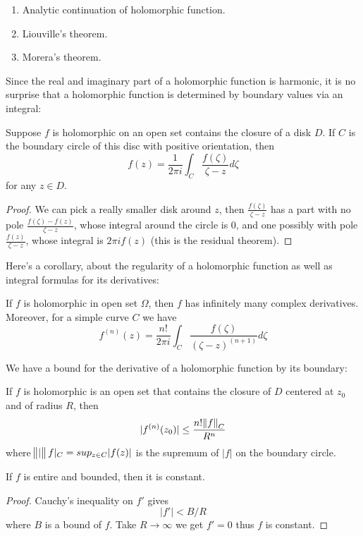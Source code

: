 \documentclass[main.tex]{subfiles}
\begin{document}
\begin{enumerate}
    \item Analytic continuation of holomorphic function. 
    \item Liouville's theorem.
    \item Morera's theorem.
\end{enumerate}

Since the real and imaginary part of a holomorphic function is harmonic, it is no surprise that a holomorphic function is determined by boundary values via an integral:

\begin{theorem}
Suppose $f$ is holomorphic on an open set contains the closure of a disk $D$. If $C$ is the boundary circle of this disc with positive orientation, then
$$
f(z) = \frac{1}{2\pi i} \int_C \frac{f(\zeta)}{\zeta - z} d\zeta
$$
for any $z \in D$.
\end{theorem}

\begin{proof}
We can pick a really smaller disk around $z$, then $\frac{f(\zeta)}{\zeta - z}$ has a part with no pole $\frac{f(\zeta) - f(z)}{\zeta - z}$, whose integral around the circle is $0$, and one possibly with pole $\frac{f(z)}{\zeta - z}$, whose integral is $2\pi i f(z)$ (this is the residual theorem).
\end{proof}

Here's a corollary, about the regularity of a holomorphic function as well as integral formulas for its derivatives:

\begin{corollary} 
If $f$ is holomorphic in open set $\Omega$, then $f$ has infinitely many complex derivatives. Moreover, for a simple curve $C$ we have 
$$
f^{(n)}(z) = \frac{n!}{2\pi i} \int_C \frac{f(\zeta)}{(\zeta - z)^{(n+1)}} d\zeta
$$
\end{corollary}

We have a bound for the derivative of a holomorphic function by its boundary:
\begin{corollary}
If $f$ is holomorphic is an open set that contains the closure of $D$ centered at $z_0$ and of radius $R$, then 
$$
|f^{(n)} (z_0)| \leq \frac{n! \norm{f}_C}{R^n}
$$
where $\norm|f|_C = sup_{z \in C}|f(z)|$ is the supremum of $|f|$ on the boundary circle.
\end{corollary}

\begin{corollary}
If $f$ is entire and bounded, then it is constant.
\end{corollary}
\begin{proof}
Cauchy's inequality on $f'$ gives 
$$
|f'| < B/R
$$
where $B$ is a bound of $f$. Take $R \rightarrow \infty$ we get $f' = 0$ thus $f$ is constant. 
\end{proof}
\end{document}
